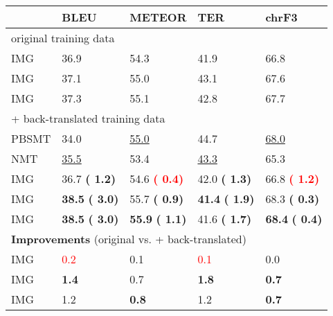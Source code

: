 \documentclass[11pt,twocolumn]{article}
\newcommand{\white}[1]{\textcolor{White}{#1}}
\newcommand{\red}[1]{\textcolor{Red}{#1}}
\newcommand{\redbf}[1]{\textbf{\textcolor{Red}{#1}}}
\newcommand{\green}[1]{\textcolor{OliveGreen}{#1}}
\newcommand{\greenbf}[1]{\textbf{\textcolor{OliveGreen}{#1}}}
\begin{document}
\begin{table}[t!]
  \centering
  \resizebox{\linewidth}{!} {
  \begin{tabular}{lllll}
   \toprule
   & BLEU & METEOR & TER & chrF3 \\
   \toprule
   
   \multicolumn{5}{l}{original training data}\\
   \midrule
   
   IMG &
   36.9 & 54.3 & 41.9 & 66.8 \\
   
   IMG &
   37.1 & 55.0 & 43.1 & 67.6 \\
   
   IMG &
   37.3 & 55.1 & 42.8 & 67.7 \\
   
   \midrule
   \multicolumn{5}{l}{+ back-translated training data}\\
   \midrule
   PBSMT & 34.0             & \underline{55.0} & 44.7 & \underline{68.0} \\
   NMT & \underline{35.5} & 53.4             & \underline{43.3} & 65.3 \\
   \midrule
   
   IMG &
   36.7
   \small\greenbf{( 1.2)} &
   54.6\white{}
   \small\redbf{( 0.4)} &
   42.0
   \small\greenbf{( 1.3)} &
   66.8 \small\redbf{( 1.2)} \\
   
   IMG &
   \textbf{38.5}
   \small\greenbf{( 3.0)} &
   55.7
   \small\greenbf{( 0.9)} &
   \textbf{41.4}
   \small\greenbf{( 1.9)} &
   68.3 \small\greenbf{( 0.3)} \\
   
   IMG &
   \textbf{38.5}
   \small\greenbf{( 3.0)} &
   \textbf{55.9}
   \small\greenbf{( 1.1)} &
   41.6
   \small\greenbf{( 1.7)} &
   \textbf{68.4} \small\greenbf{( 0.4)} \\
   
   \midrule
   \multicolumn{4}{l}{\textbf{Improvements} (original vs. + back-translated)}\\
   \midrule
   
   IMG&
   {\small\red{ 0.2}} &
   {\small\green{ 0.1}} &
   {\small\red{ 0.1}} &
   {\small\green{ 0.0}} \\
   
   IMG&
   {\small\greenbf{ 1.4}}&
   {\small\green{ 0.7}}&
   {\small\greenbf{ 1.8}}&
   {\small\greenbf{ 0.7}}\\

   IMG&
   {\small\green{ 1.2}}&
   {\small\greenbf{ 0.8}}&
   {\small\green{ 1.2}}&
   {\small\greenbf{ 0.7}}\\
   

\end{tabular}}
\end{table}
\end{document}
